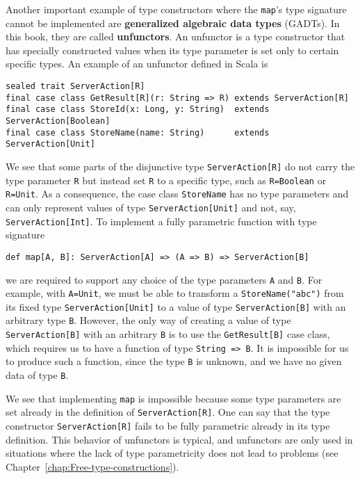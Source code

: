 Another important example of type constructors where the \lstinline!map!'s
type signature cannot be implemented are \textbf{generalized
algebraic data types} (GADTs). In this book, they are
called \textbf{unfunctors}. An unfunctor is a type
constructor that has specially constructed values when its type parameter
is set only to certain specific types. An example of an unfunctor
defined in Scala is
\begin{lstlisting}
sealed trait ServerAction[R]
final case class GetResult[R](r: String => R) extends ServerAction[R]
final case class StoreId(x: Long, y: String)  extends ServerAction[Boolean]
final case class StoreName(name: String)      extends ServerAction[Unit]
\end{lstlisting}
We see that some parts of the disjunctive type \lstinline!ServerAction[R]!
do not carry the type parameter \lstinline!R! but instead set \lstinline!R!
to a specific type, such as \lstinline!R=Boolean! or \lstinline!R=Unit!.
As a consequence, the case class \lstinline!StoreName! has no type
parameters and can only represent values of type \lstinline!ServerAction[Unit]!
and not, say, \lstinline!ServerAction[Int]!. To implement a fully
parametric function with type signature
\begin{lstlisting}
def map[A, B]: ServerAction[A] => (A => B) => ServerAction[B]
\end{lstlisting}
we are required to support any choice of the type parameters \lstinline!A!
and \lstinline!B!. For example, with \lstinline!A=Unit!, we must
be able to transform a \lstinline!StoreName("abc")! from its fixed
type \lstinline!ServerAction[Unit]! to a value of type \lstinline!ServerAction[B]!
with an arbitrary type \lstinline!B!. However, the only way of creating
a value of type \lstinline!ServerAction[B]! with an arbitrary \lstinline!B!
is to use the \lstinline!GetResult[B]! case class, which requires
us to have a function of type \lstinline!String => B!. It is impossible
for us to produce such a function, since the type \lstinline!B! is
unknown, and we have no given data of type \lstinline!B!. 

We see that implementing \lstinline!map! is impossible because some
type parameters are set already in the definition of \lstinline!ServerAction[R]!.
One can say that the type constructor \lstinline!ServerAction[R]!
fails to be fully parametric already in its type definition. This
behavior of unfunctors is typical, and unfunctors are only used in
situations where the lack of type parametricity does not lead to problems
(see Chapter~\ref{chap:Free-type-constructions}).

